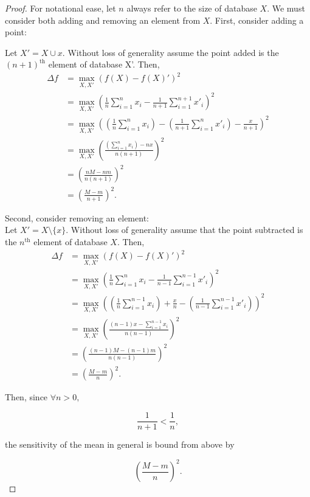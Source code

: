 \documentclass[11pt]{scrartcl} %
\begin{document}
\begin{proof}
	For notational ease, let $n$ always refer to the size of database $X$. We must consider both adding and removing an element from $X$. First, consider adding a point:

	Let $X' = X \cup x$. Without loss of generality assume the point added is the $(n+1)^\text{th}$ element of database X'. Then,
	\begin{align*}
		\Delta f &= \max_{X,X'} (f(X)- f(X)')^2 \\
					   &= \max_{X,X'} \left( \frac{1}{n}\sum_{i=1}^{n}x_i - \frac{1}{n+1}\sum_{i=1}^{n+1}x'_i \right)^2 \\
					   &= \max_{X,X'} \left( \left(\frac{1}{n}\sum_{i=1}^{n}x_i\right) - \left(\frac{1}{n+1}\sum_{i=1}^{n}x'_i\right) - \frac{x}{n+1} \right)^2 \\
					   &= \max_{X,X'} \left( \frac{ \left(\sum_{i=1}^{n}x_i\right) - nx }{n(n+1)} \right)^2 \\
					   &= \left( \frac{nM - nm}{n(n+1)} \right)^2 \\
					   &= \left( \frac{M - m}{n+1} \right)^2.
	\end{align*}

Second, consider removing an element:\\
Let $X' = X \setminus \{ x \}$. Without loss of generality assume that the point subtracted is the $n^\text{th}$ element of database $X$. Then,
	\begin{align*}
		\Delta f &= \max_{X,X'} (f(X)- f(X)')^2 \\
					   &= \max_{X,X'} \left( \frac{1}{n}\sum_{i=1}^{n}x_i - \frac{1}{n-1}\sum_{i=1}^{n-1}x'_i \right)^2 \\
					   &= \max_{X,X'} \left( \left( \frac{1}{n}\sum_{i=1}^{n-1}x_i \right) + \frac{x}{n} - \left( \frac{1}{n-1}\sum_{i=1}^{n-1}x'_i \right) \right)^2 \\
					   &= \max_{X,X'} \left( \frac{(n-1)x - \sum_{i=1}^{n-1}x_i }{n(n-1)} \right)^2 \\
					   &= \left( \frac{(n-1)M - (n-1)m}{n(n-1)} \right)^2 \\
					   &= \left( \frac{M-m}{n} \right)^2.
	\end{align*}
	
Then, since $\forall n > 0,$

$$ \frac{1}{n+1} < \frac{1}{n},$$

the sensitivity of the mean in general is bound from above by 

$$ \left(\frac{M-m}{n}\right)^2.$$
\end{proof}

% 
% 
\end{document}
